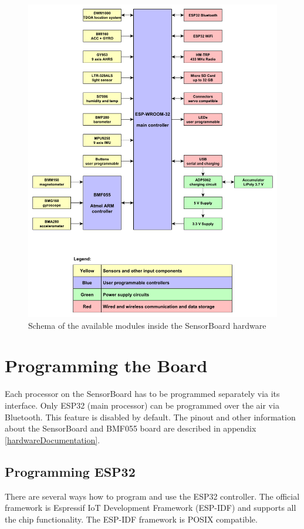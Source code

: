 \begin{figure}
    \centering
    \label{fig:SWmodules}
    \caption{Schema of the available modules inside the SensorBoard hardware}
    \includegraphics[width=\linewidth]{img/SensorBoardSchema.pdf}
\end{figure}

\section{Programming the Board}
Each processor on the SensorBoard has to be programmed separately via its interface. Only ESP32 \cite{espressif:ESP-WROOM-32} (main processor) can be programmed over the air via Bluetooth. This feature is disabled by default. The pinout and other information about the SensorBoard and BMF055 board are described in appendix \ref{hardwareDocumentation}.

\subsection{Programming ESP32}
There are several ways how to program and use the ESP32 \cite{espressif:ESP-WROOM-32} controller. The official framework is Espressif \ac{IoT} Development Framework (\ac{ESP-IDF}) \cite{espressif:ESP-IDF} and supports all the chip functionality. The \ac{ESP-IDF} framework is \ac{POSIX} compatible.

